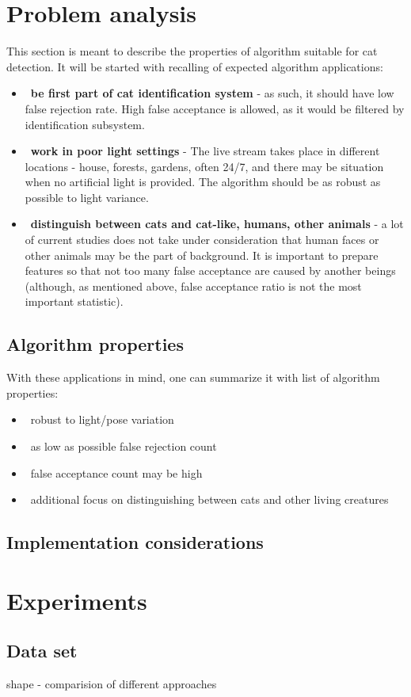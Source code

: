 \documentclass[hyperref]{acmtrans2e}
\begin{document}
\section{Problem analysis}
This section is meant to describe the properties of algorithm suitable for cat detection. It will be started with recalling of expected algorithm applications:
\begin{itemize}
\item~\textbf{be first part of cat identification system} - as such, it should have low false rejection rate. High false acceptance is allowed, as it would be filtered by identification subsystem.
\item~\textbf{work in poor light settings} - The live stream takes place in different locations - house, forests, gardens, often 24/7, and there may be situation when no artificial light is provided. The algorithm should be as robust as possible to light variance.
\item~\textbf{distinguish between cats and cat-like, humans, other animals} - a lot of current studies does not take under consideration that human faces or other animals may be the part of background. It is important to prepare features so that not too many false acceptance are caused by another beings (although, as mentioned above, false acceptance ratio is not the most important statistic).
\end{itemize}
\subsection{Algorithm properties}
With these applications in mind, one can summarize it with list of algorithm properties:
\begin{itemize}
\item~robust to light/pose variation 
\item~as low as possible false rejection count
\item~false acceptance count may be high
\item~additional focus on distinguishing between cats and other living creatures
\end{itemize}
\subsection{Implementation considerations}
\section{Experiments}
\subsection{Data set}
shape - comparision of different approaches
\end{document}
